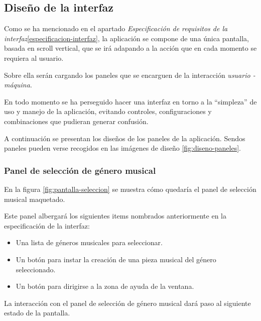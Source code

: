 \subsection{Diseño de la interfaz}

Como se ha mencionado en el apartado \emph{Especificación de requisitos de la interfaz}\ref{especificacion-interfaz}, la aplicación se compone de una única pantalla, basada en scroll vertical, que se irá adapando a la acción que en cada momento se requiera al usuario.

Sobre ella serán cargando los paneles que se encarguen de la interacción \emph{usuario - máquina}.

En todo momento se ha perseguido hacer una interfaz en torno a la ``simpleza'' de uso y manejo de la aplicación, evitando controles, configuraciones y combinaciones que pudieran generar confusión.

A continuación se presentan los diseños de los paneles de la aplicación. Sendos paneles pueden verse recogidos en las imágenes de diseño \ref{fig:diseno-paneles}.

\subsubsection{Panel de selección de género musical}

En la figura \ref{fig:pantalla-seleccion} se muestra cómo quedaría el panel de selección musical maquetado.


Este panel albergará los siguientes items nombrados anteriormente en la especificación de la interfaz:

\begin{itemize}
    \item Una lista de géneros musicales para seleccionar.
    \item Un botón para instar la creación de una pieza musical del género seleccionado.
    \item Un botón para dirigirse a la zona de ayuda de la ventana.
\end{itemize}

La interacción con el panel de selección de género musical dará paso al siguiente estado de la pantalla.

